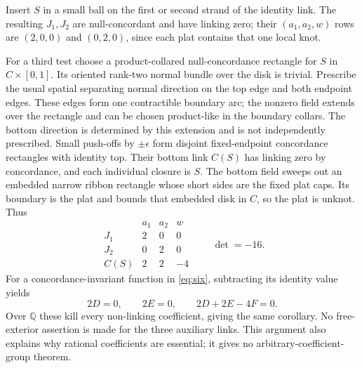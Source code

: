 \documentclass[11pt]{article}
\theoremstyle{remark}\newtheorem{remark}[theorem]{Remark}
\newcommand{\Q}{\mathbb Q}
\begin{document}
Insert $S$ in a small ball on the first or second strand of the identity
link. The resulting $J_1,J_2$ are null-concordant and have linking zero;
their $(a_1,a_2,w)$ rows are $(2,0,0)$ and $(0,2,0)$, since each plat
contains that one local knot.

For a third test choose a product-collared null-concordance rectangle for
$S$ in $C\times[0,1]$. Its oriented rank-two normal bundle over the disk
is trivial. Prescribe the usual spatial separating normal direction on
the top edge and both endpoint edges. These edges form one contractible
boundary arc; the nonzero field extends over the rectangle and can be
chosen product-like in the boundary collars. The bottom direction is
determined by this extension and is not independently prescribed. Small
push-offs by $\pm\epsilon$ form disjoint fixed-endpoint concordance
rectangles with identity top. Their bottom link $C(S)$ has linking zero
by concordance, and each individual closure is $S$. The bottom field sweeps
out an embedded narrow ribbon rectangle whose short sides are the fixed
plat caps. Its boundary is the plat and bounds that embedded disk in $C$,
so the plat is unknot. Thus
\begin{equation}\label{eq:slice-rows}
\begin{array}{c|rrr}
 &a_1&a_2&w\\\hline
 J_1&2&0&0\\J_2&0&2&0\\C(S)&2&2&-4
\end{array}
\qquad \det=-16.
\end{equation}
For a concordance-invariant function in \eqref{eq:six}, subtracting its
identity value yields
\[
2D=0,\qquad 2E=0,\qquad 2D+2E-4F=0.
\]
Over $\Q$ these kill every non-linking coefficient, giving the same
corollary. No free-exterior assertion is made for the three auxiliary
links. This argument also explains why rational coefficients are essential;
it gives no arbitrary-coefficient-group theorem.
\end{document}

